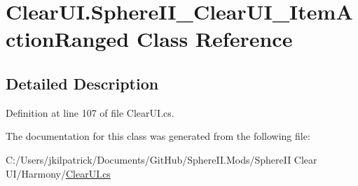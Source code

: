 \hypertarget{class_clear_u_i_1_1_sphere_i_i___clear_u_i___item_action_ranged}{}\section{Clear\+U\+I.\+Sphere\+I\+I\+\_\+\+Clear\+U\+I\+\_\+\+Item\+Action\+Ranged Class Reference}
\label{class_clear_u_i_1_1_sphere_i_i___clear_u_i___item_action_ranged}


\subsection{Detailed Description}


Definition at line 107 of file Clear\+U\+I.\+cs.



The documentation for this class was generated from the following file\+:\begin{DoxyCompactItemize}
\item 
C\+:/\+Users/jkilpatrick/\+Documents/\+Git\+Hub/\+Sphere\+I\+I.\+Mods/\+Sphere\+I\+I Clear U\+I/\+Harmony/\mbox{\hyperlink{_clear_u_i_8cs}{Clear\+U\+I.\+cs}}\end{DoxyCompactItemize}
